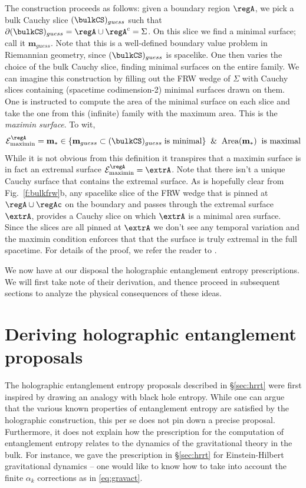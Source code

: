 \documentclass[12pt,openany]{book}
\begin{document}
The construction proceeds as follows:  given a boundary region $\regA$, we pick a bulk Cauchy slice $(\bulkCS)_{guess}$ such that $\partial( \bulkCS)_{guess}= \regA \cup\regA^c = \Sigma$. On this slice we find a minimal surface; call it $\mathbf{m}_{guess}$. Note that this is a well-defined boundary value problem in Riemannian geometry, since $(\bulkCS)_{guess}$ is spacelike. One then varies the choice of the bulk Cauchy slice, finding minimal surfaces on the entire family. We can imagine this construction by filling out the FRW wedge of $\Sigma$ with Cauchy slices containing (spacetime codimension-2) minimal surfaces  drawn on them. One is instructed to compute the area of the minimal surface on each slice and take the one from this (infinite) family with the maximum area. This is the {\em maximin surface}. To wit,
%
\begin{equation}
{\cal E}_\text{maximin}^\regA = \mathbf{m}_{*} \in \{ \textbf{m}_{guess} \subset (\bulkCS)_{guess} \; \text{is minimal}\} \;\; \& \;\; \text{Area}{(\mathbf{m}_*)}  \;\; \text{is maximal}
\label{}
\end{equation}
%
While it is not obvious from this definition it transpires that a maximin surface is in fact an extremal surface ${\cal E}_\text{maximin}^\regA  = \extrA$. Note that there isn't a unique Cauchy surface that contains the extremal surface. As is hopefully clear from Fig.~\ref{f:bulkfrw}b, any spacelike slice of the FRW wedge that is pinned at $\regA \cup\regAc$ on the boundary and passes through the extremal surface $\extrA$, provides a Cauchy slice on which $\extrA$ is a minimal area surface. Since the slices are all pinned at $\extrA$ we don't see any temporal variation and the maximin condition enforces that that the surface is truly extremal in the full spacetime. For details of the proof, we refer the reader to \cite{Wall:2012uf}.

We now have at our disposal the holographic entanglement entropy prescriptions. We will first take note of their derivation, and thence proceed in subsequent sections to analyze the physical consequences of these ideas.


\chapter{Deriving holographic entanglement proposals}
\label{sec:derivation}

The holographic entanglement entropy proposals described in \S\ref{sec:hrrt} were first inspired by drawing an analogy with black hole entropy. While one can argue that the various known  properties of entanglement entropy are satisfied by the holographic construction, this per se does not pin down a precise proposal. Furthermore, it does not explain how the
prescription for the computation of entanglement entropy relates to the dynamics of the gravitational theory in the bulk. For instance, we gave the prescription in \S\ref{sec:hrrt} for Einstein-Hilbert gravitational dynamics -- one would like to know how to take into account the finite $\alpha_k$ corrections as in \eqref{eq:gravact}.
\end{document}

